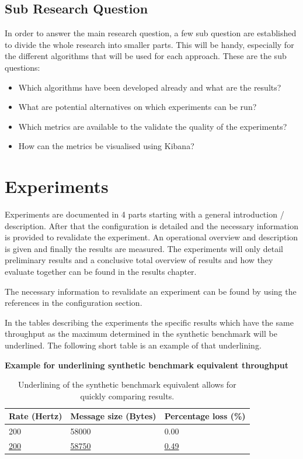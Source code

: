 \documentclass[]{article}
\begin{document}
\subsection{Sub Research Question}
In order to answer the main research question, a few sub question are established to divide the whole research into smaller parts. This will be handy, especially for the different algorithms that will be used for each approach. These are the sub questions:
\begin{itemize}
	\itemsep 0em
	\item Which algorithms have been developed already and what are the results?
	\item What are potential alternatives on which experiments can be run?
	\item Which metrics are available to the validate the quality of the experiments?
	\item How can the metrics be visualised using Kibana?
\end{itemize}


\section{Experiments}
Experiments are documented in 4 parts starting with a general introduction / description. After that the configuration is detailed and the necessary information is provided to revalidate the experiment. An operational overview and description is given and finally the results are measured. The experiments will only detail preliminary results and a conclusive total overview of results and how they evaluate together can be found in the results chapter. 

The necessary information to revalidate an experiment can be found by using the references in the configuration section.

In the tables describing the experiments the specific results which have the same throughput as the maximum determined in the synthetic benchmark will be underlined. The following short table is an example of that underlining.

\begin{table}[H]
	\textbf{Example for underlining synthetic benchmark equivalent throughput}
	\begin{center}
		\begin{tabular}{ | l | l | l | }
			\hline
			\textbf{Rate (Hertz)} & \textbf{Message size (Bytes)} & \textbf{Percentage loss (\%)} \\ \hline
			
			200 & 58000 & 0.00 \\ \hline
			\underline{200} & \underline{58750} & \underline{0.49} \\ \hline
		\end{tabular}
		\caption{Underlining of the synthetic benchmark equivalent allows for quickly comparing results.}
		\label{tab:specs}
	\end{center}
\end{table}
\end{document}
